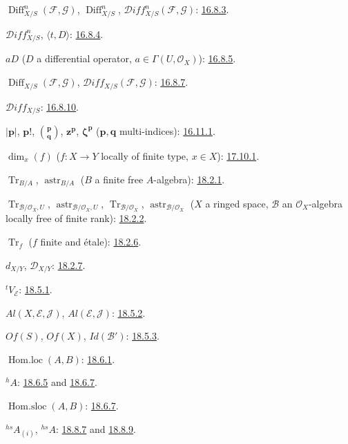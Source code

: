 $\operatorname{Diff}^{n}_{X/S}(\mathcal{F},\mathcal{G})$,
$\operatorname{Diff}^{n}_{X/S}$,
$\mathcal{D}iff^{n}_{X/S}(\mathcal{F},\mathcal{G})$:
{\hyperref[IV.16.8.3]{16.8.3}}.

$\mathcal{D}iff^{n}_{X/S}$, $\langle t,D\rangle$:
{\hyperref[IV.16.8.4]{16.8.4}}.

$aD$ ($D$ a differential operator, $a\in\Gamma(U,\mathcal{O}_X)$):
{\hyperref[IV.16.8.5]{16.8.5}}.

$\operatorname{Diff}_{X/S}(\mathcal{F},\mathcal{G})$,
$\mathcal{D}iff_{X/S}(\mathcal{F},\mathcal{G})$:
{\hyperref[IV.16.8.7]{16.8.7}}.

$\mathcal{D}iff_{X/S}$: {\hyperref[IV.16.8.10]{16.8.10}}.

$|\mathbf p|$, $\mathbf p!$, $\binom{\mathbf p}{\mathbf q}$,
$\mathbf z^{\mathbf p}$, $\boldsymbol\zeta^{\mathbf p}$
($\mathbf p,\mathbf q$ multi-indices): {\hyperref[IV.16.11.1]{16.11.1}}.

$\dim_x(f)$ ($f:X\to Y$ locally of finite type, $x\in X$):
{\hyperref[section:IV.17]{17.10.1}}.

$\operatorname{Tr}_{B/A}$, $\operatorname{astr}_{B/A}$
($B$ a finite free $A$-algebra): {\hyperref[IV.18.2.1]{18.2.1}}.

$\operatorname{Tr}_{\mathcal B/\mathcal O_X,U}$,
$\operatorname{astr}_{\mathcal B/\mathcal O_X,U}$,
$\operatorname{Tr}_{\mathcal B/\mathcal O_X}$,
$\operatorname{astr}_{\mathcal B/\mathcal O_X}$
($X$ a ringed space, $\mathcal B$ an $\mathcal O_X$-algebra locally free
of finite rank): {\hyperref[IV.18.2.2]{18.2.2}}.

$\operatorname{Tr}_f$ ($f$ finite and \'etale): {\hyperref[IV.18.2.6]{18.2.6}}.

$d_{X/Y}$, $\mathcal D_{X/Y}$: {\hyperref[IV.18.2.7]{18.2.7}}.

${}^{t}V_{\mathcal E}$: {\hyperref[IV.18.5.1]{18.5.1}}.

$Al(X,\mathcal E,\mathcal J)$, $Al(\mathcal E,\mathcal J)$:
{\hyperref[IV.18.5.2]{18.5.2}}.

$Of(S)$, $Of(X)$, $Id(\mathcal B')$: {\hyperref[IV.18.5.3]{18.5.3}}.

$\operatorname{Hom.loc}(A,B)$: {\hyperref[IV.18.6.1]{18.6.1}}.

${}^{h}A$: {\hyperref[IV.18.6.5]{18.6.5}} and {\hyperref[IV.18.6.7]{18.6.7}}.

$\operatorname{Hom.sloc}(A,B)$: {\hyperref[IV.18.6.7]{18.6.7}}.

${}^{hs}A_{(i)}$, ${}^{hs}A$: {\hyperref[IV.18.8.7]{18.8.7}} and
{\hyperref[IV.18.8.9]{18.8.9}}.

